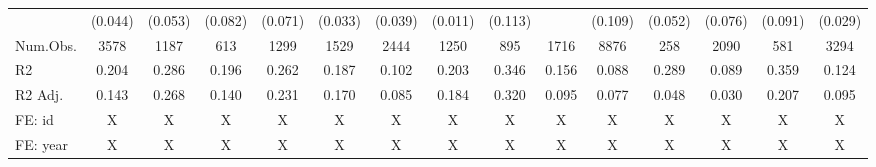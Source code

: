 \begin{table}
\begin{tabular}[t]{lcccccccccccccc}
\hspace{1em} & (0.044) & (0.053) & (0.082) & (0.071) & (0.033) & (0.039) & (0.011) & (0.113) &  & (0.109) & (0.052) & (0.076) & (0.091) & (0.029)\\
\hspace{1em}Num.Obs. & 3578 & 1187 & 613 & 1299 & 1529 & 2444 & 1250 & 895 & 1716 & 8876 & 258 & 2090 & 581 & 3294\\
\hspace{1em}R2 & 0.204 & 0.286 & 0.196 & 0.262 & 0.187 & 0.102 & 0.203 & 0.346 & 0.156 & 0.088 & 0.289 & 0.089 & 0.359 & 0.124\\
\hspace{1em}R2 Adj. & 0.143 & 0.268 & 0.140 & 0.231 & 0.170 & 0.085 & 0.184 & 0.320 & 0.095 & 0.077 & 0.048 & 0.030 & 0.207 & 0.095\\
\hspace{1em}FE: id & X & X & X & X & X & X & X & X & X & X & X & X & X & X\\
\hspace{1em}FE: year & X & X & X & X & X & X & X & X & X & X & X & X & X & X\\
\bottomrule
\end{tabular}
\end{table}